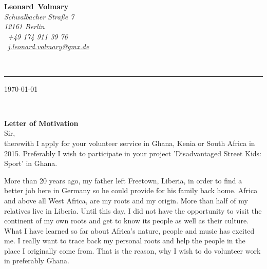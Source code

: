 \documentclass[11pt,a4paper]{article}
\def\firstname{Leonard}
\def\familyname{Volmary}
\begin{document}
\sffamily   %
\hfill%
\begin{minipage}[t]{.6\textwidth}
	\raggedleft%
	{\bfseries {\color{firstnamecolor}\firstname}~{\color{familynamecolor}\familyname}}\\[.35ex]
	\small\itshape%
	Schwalbacher Straße 7\\
	12161 Berlin\\[.35ex]
	\Mobilefone~+49 174 911 39 76\\
	\Letter~\href{mailto:j.leonard.volmary@gmx.de}{j.leonard.volmary@gmx.de}
\end{minipage}\\[0.5em]
%
{\color{firstnamecolor}\rule{\textwidth}{.25ex}}
%
\begin{minipage}[t]{.4\textwidth}
	\raggedright%
	\vspace*{1em}
\end{minipage}
%
\hfill
%
\begin{minipage}[t]{.4\textwidth}
	\raggedleft %
	\today
\end{minipage}\\[1.5em]
\raggedright

{\bfseries \color{familynamecolor}Letter of Motivation}\\[1.5em]

Sir,\\[1em]
%
therewith I apply for your volunteer service in Ghana, Kenia or South Africa in 2015. Preferably I wish to participate in your project 'Disadvantaged Street Kids: Sport' in Ghana.

More than 20 years ago, my father left Freetown, Liberia, in order to find a better job here in Germany so he could provide for his family back home. Africa and above all West Africa, are my roots and my origin. More than half of my relatives live in Liberia. Until this day, I did not have the opportunity to visit the continent of my own roots and get to know its people as well as their culture. What I have learned so far about Africa's nature, people and music has excited me. I really want to trace back my personal roots and help the people in the place I originally come from. That is the reason, why I wish to do volunteer work in preferably Ghana.
\end{document}
